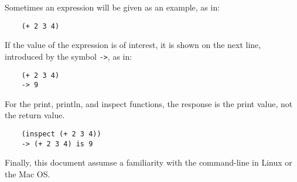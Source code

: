 \documentclass{book}
\begin{document}
Sometimes an expression will be given as an example, as in:

\begin{verbatim}
    (+ 2 3 4)
\end{verbatim}

If the value of the expression is of interest, it is shown
on the next line, introduced by the symbol \verb!->!, as in:

\begin{verbatim}
    (+ 2 3 4)
    -> 9
\end{verbatim}

For the print, println, and inspect functions, the response
is the print value, not the return value.

\begin{verbatim}
    (inspect (+ 2 3 4))
    -> (+ 2 3 4) is 9
\end{verbatim}

Finally, this document assumse a familiarity with the command-line in
Linux or the Mac OS.




%
%
%
%
%
%
%
%
%
%
%
%
%
%
%
%
%
%
%
%
\end{document}
